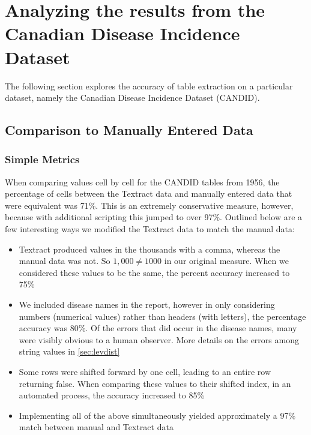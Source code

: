 \documentclass[12pt]{article}
\begin{document}
\section{Analyzing the results from the Canadian Disease Incidence Dataset} \label{sec:NDD}
The following section explores the accuracy of table extraction on a particular dataset, namely the Canadian Disease Incidence Dataset (CANDID). 


\subsection{Comparison to Manually Entered Data}
\subsubsection{Simple Metrics}\label{sec:simple}
When comparing values cell by cell for the CANDID tables from 1956, the percentage of cells between the Textract data and manually entered data that were equivalent was 71\%. This is an extremely conservative measure, however, because with additional scripting this jumped to over 97\%. Outlined below are a few interesting ways we modified the Textract data to match the manual data:
\begin{itemize}
    \item Textract produced values in the thousands with a comma, whereas the manual data was not. So $1,000 \neq 1000$ in our original measure. When we considered these values to be the same, the percent accuracy increased to 75\%
    \item We included disease names in the report, however in only considering numbers (numerical values) rather than headers (with letters), the percentage accuracy was 80\%. Of the errors that did occur in the disease names, many were visibly obvious to a human observer. More details on the errors among string values in \cref{sec:levdist}
    \item Some rows were shifted forward by one cell, leading to an entire row returning false. When comparing these values to their shifted index, in an automated process, the accuracy increased to 85\%
    \item Implementing all of the above simultaneously yielded approximately a 97\% match between manual and Textract data
\end{itemize}
\end{document}
